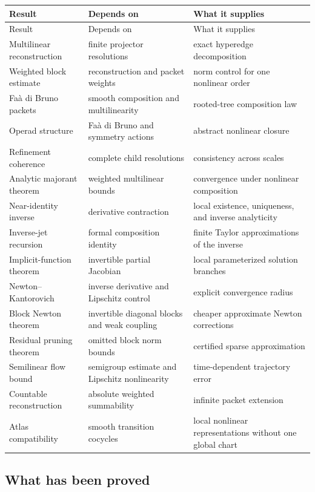 \documentclass[11pt]{article}
\theoremstyle{definition}
\theoremstyle{remark}
\begin{document}
\begin{longtable}{p{.24\linewidth}p{.28\linewidth}p{.38\linewidth}}
\toprule
Result & Depends on & What it supplies\\
\midrule
\endfirsthead
\toprule
Result & Depends on & What it supplies\\
\midrule
\endhead
Multilinear reconstruction & finite projector resolutions & exact hyperedge decomposition\\
Weighted block estimate & reconstruction and packet weights & norm control for one nonlinear order\\
Fa\`a di Bruno packets & smooth composition and multilinearity & rooted-tree composition law\\
Operad structure & Fa\`a di Bruno and symmetry actions & abstract nonlinear closure\\
Refinement coherence & complete child resolutions & consistency across scales\\
Analytic majorant theorem & weighted multilinear bounds & convergence under nonlinear composition\\
Near-identity inverse & derivative contraction & local existence, uniqueness, and inverse analyticity\\
Inverse-jet recursion & formal composition identity & finite Taylor approximations of the inverse\\
Implicit-function theorem & invertible partial Jacobian & local parameterized solution branches\\
Newton--Kantorovich & inverse derivative and Lipschitz control & explicit convergence radius\\
Block Newton theorem & invertible diagonal blocks and weak coupling & cheaper approximate Newton corrections\\
Residual pruning theorem & omitted block norm bounds & certified sparse approximation\\
Semilinear flow bound & semigroup estimate and Lipschitz nonlinearity & time-dependent trajectory error\\
Countable reconstruction & absolute weighted summability & infinite packet extension\\
Atlas compatibility & smooth transition cocycles & local nonlinear representations without one global chart\\
\bottomrule
\end{longtable}


\subsection{What has been proved}
\end{document}
